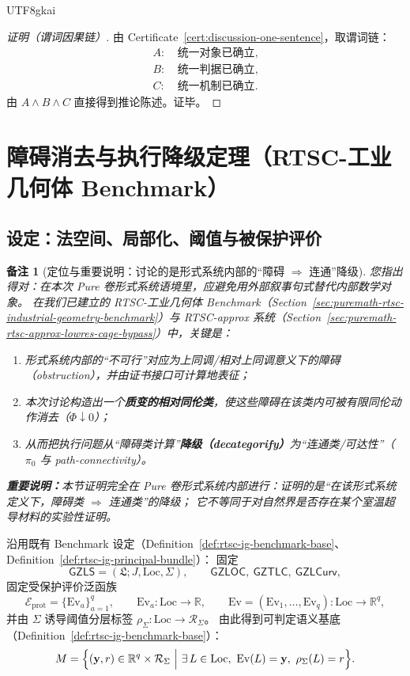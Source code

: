 \documentclass[12pt]{article}
\newtheorem{remark}{备注}[section]
\newcommand{\GZLS}{\ensuremath{\mathsf{GZLS}}}
\newcommand{\GZLOC}{\ensuremath{\mathsf{GZLOC}}}
\newcommand{\GZLCurv}{\ensuremath{\mathsf{GZLCurv}}}
\newcommand{\GZTLC}{\ensuremath{\mathsf{GZTLC}}}
\newcommand{\RTSC}{\textsf{RTSC}}
\begin{document}
\begin{CJK*}{UTF8}{gkai}
\begin{proof}[证明（谓词因果链）]
由 Certificate~\ref{cert:discussion-one-sentence}，取谓词链：
\[
\begin{aligned}
A:&\ \text{统一对象已确立},\\
B:&\ \text{统一判据已确立},\\
C:&\ \text{统一机制已确立}.
\end{aligned}
\]
由 $A\wedge B\wedge C$ 直接得到推论陈述。证毕。
\end{proof}

\clearpage
\section{障碍消去与执行降级定理（\RTSC{}-工业几何体 Benchmark）}
\label{sec:puremath-obstruction-to-pi0}

\subsection{设定：法空间、局部化、阈值与被保护评价}

\begin{remark}[定位与重要说明：讨论的是形式系统内部的“障碍 $\Rightarrow$ 连通”降级]
您指出得对：在本次 Pure 卷形式系统语境里，应避免用外部叙事句式替代内部数学对象。
在我们已建立的 \RTSC{}-工业几何体 Benchmark（Section~\ref{sec:puremath-rtsc-industrial-geometry-benchmark}）与
\textsf{RTSC-approx} 系统（Section~\ref{sec:puremath-rtsc-approx-lowres-cage-bypass}）中，关键是：
\begin{enumerate}
  \item 形式系统内部的“不可行”对应为上同调/相对上同调意义下的障碍（obstruction），并由证书接口可计算地表征；
  \item 本次讨论构造出一个\textbf{质变的相对同伦类}，使这些障碍在该类内可被有限同伦动作消去（$\Phi\downarrow 0$）；
  \item 从而把执行问题从“障碍类计算”\textbf{降级（decategorify）}为“连通类/可达性”（$\pi_0$ 与 path-connectivity）。
\end{enumerate}
\textbf{重要说明：}本节证明完全在 Pure 卷形式系统内部进行：证明的是“在该形式系统定义下，障碍类 $\Rightarrow$ 连通类”的降级；
它不等同于对自然界是否存在某个室温超导材料的实验性证明。
\end{remark}

沿用既有 Benchmark 设定（Definition~\ref{def:rtsc-ig-benchmark-base}、Definition~\ref{def:rtsc-ig-principal-bundle}）：
固定
\[
\GZLS=(\mathfrak{L};J,\mathrm{Loc},\Sigma),\qquad \GZLOC,\ \GZTLC,\ \GZLCurv,
\]
固定受保护评价泛函族
\[
\mathcal{E}_{\mathrm{prot}}=\{\mathrm{Ev}_a\}_{a=1}^{q},\qquad
\mathrm{Ev}_a:\mathrm{Loc}\to\mathbb{R},\qquad
\mathrm{Ev}=(\mathrm{Ev}_1,\dots,\mathrm{Ev}_q):\mathrm{Loc}\to\mathbb{R}^q,
\]
并由 $\Sigma$ 诱导阈值分层标签 $\rho_{\Sigma}:\mathrm{Loc}\to\mathcal{R}_{\Sigma}$。
由此得到可判定语义基底（Definition~\ref{def:rtsc-ig-benchmark-base}）：
\[
M=\Bigl\{
(\mathbf{y},r)\in\mathbb{R}^q\times \mathcal{R}_{\Sigma}\ \Big|\ \exists\,L\in\mathrm{Loc},\ \mathrm{Ev}(L)=\mathbf{y},\
  \rho_{\Sigma}(L)=r
\Bigr\}.
\]


\end{CJK*}
\end{document}
